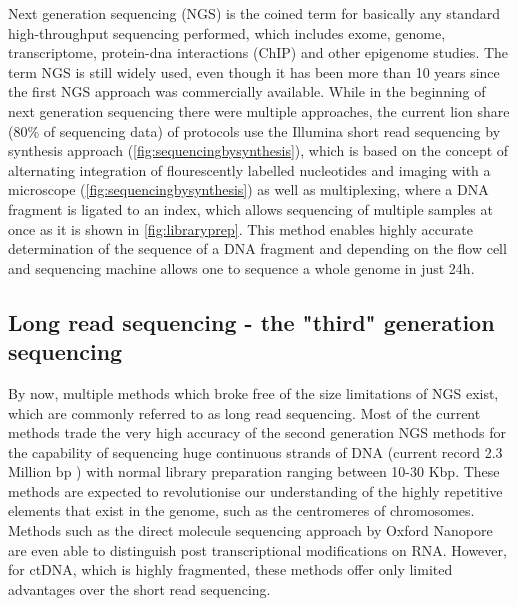Next generation sequencing (NGS) is the coined term for basically any standard high-throughput sequencing performed, which includes exome, genome, transcriptome, \linebreak protein-dna interactions (ChIP) and other epigenome studies. The term NGS is still widely used, even though it has been more than 10 years since the first NGS approach was commercially available. While in the beginning of next generation sequencing there were multiple approaches, the current lion share (80\% of sequencing data) of protocols use the Illumina short read sequencing by synthesis approach (\autoref{fig:sequencingbysynthesis})\cite{Mardis2008,Straiton2019}, which is based on the concept of alternating integration of flourescently labelled nucleotides and imaging with a microscope (\autoref{fig:sequencingbysynthesis}) as well as multiplexing, where a DNA fragment is ligated to an index, which allows sequencing of multiple samples at once \cite{Church1984,Church1988} as it is shown in \autoref{fig:libraryprep}. This method enables highly accurate determination of the sequence of a DNA fragment and depending on the flow cell and sequencing machine allows one to sequence a whole genome in just 24h.

\subsection[Long read sequencing]{Long read sequencing - the "third" generation sequencing}
\label{intro-sec:lrs}
By now, multiple methods which broke free of the size limitations of NGS exist, which are commonly referred to as long read sequencing. Most of the current methods trade the very high accuracy of the second generation NGS methods for the capability of sequencing huge continuous strands of DNA (current record 2.3 Million bp \cite{Payne2018}) with normal library preparation ranging between 10-30 Kbp. 
These methods are expected to revolutionise our understanding of the highly repetitive elements that exist in the genome, such as the centromeres of chromosomes. Methods such as the direct molecule sequencing approach by Oxford Nanopore are even able to distinguish post transcriptional modifications on RNA\cite{Pratanwanich2021}.
However, for ctDNA, which is highly fragmented, these methods offer only limited advantages over the short read sequencing.

